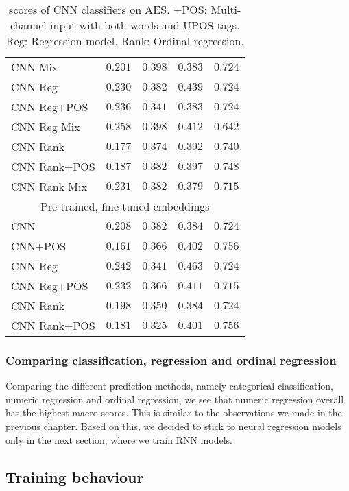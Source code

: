 \begin{table}
\begin{tabular}{lrrrr}
    CNN Mix & $0.201$ & $\mathbf{0.398}$ & $0.383$ & $0.724$ \\
    CNN Reg & $0.230$ & $0.382$ & $0.439$ & $0.724$ \\
    CNN Reg+POS & $0.236$ & $0.341$ & $0.383$ & $0.724$ \\
    CNN Reg Mix & $\mathbf{0.258}$ & $\mathbf{0.398}$ & $0.412$ & $0.642$ \\
    CNN Rank & $0.177$ & $0.374$ & $0.392$ & $0.740$ \\
    CNN Rank+POS & $0.187$ & $0.382$ & $0.397$ & $0.748$ \\
    CNN Rank Mix & $0.231$ & $0.382$ & $0.379$ & $0.715$ \\
    \midrule
    \multicolumn{5}{c}{Pre-trained, fine tuned embeddings} \\
    \midrule
    CNN & $0.208$ & $0.382$ & $0.384$ & $0.724$ \\
    CNN+POS & $0.161$ & $0.366$ & $0.402$ & $\mathbf{0.756}$ \\
    CNN Reg & $0.242$ & $0.341$ & $\mathbf{0.463}$ & $0.724$ \\
    CNN Reg+POS & $0.232$ & $0.366$ & $0.411$ & $0.715$ \\
    CNN Rank & $0.198$ & $0.350$ & $0.384$ & $0.724$ \\
    CNN Rank+POS & $0.181$ & $0.325$ & $0.401$ & $\mathbf{0.756}$ \\
    \bottomrule
  \end{tabular}
  \caption[\FI scores of CNN classifiers on AES.]{
    \FI scores of CNN classifiers on AES. +POS: Multi-channel input with
    both words and UPOS tags. Reg: Regression model. Rank: Ordinal regression.
  }
  \label{tab:cnn-results}
\end{table}


\subsubsection{Comparing classification, regression and ordinal regression}

Comparing the different prediction methods, namely categorical
classification, numeric regression and ordinal regression, we see that
numeric regression overall has the highest macro \FI scores. This is similar
to the observations we made in the previous chapter. Based on this, we
decided to stick to neural regression models only in the next section, where
we train \ac{RNN} models.


\subsection{Training behaviour}

